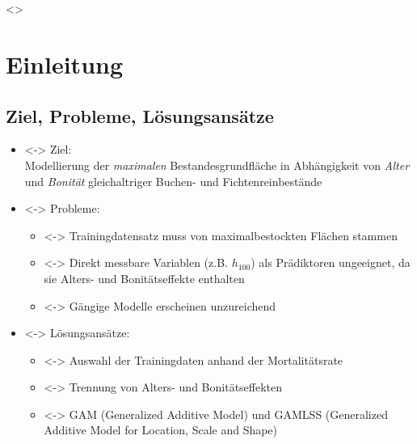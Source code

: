 
\section*{}
\begin{frame}[c]
  \only<\theFirstElement>{}
\end{frame}

\section{Einleitung}
\subsection{Ziel, Probleme, Lösungsansätze}
\begin{frame}[c]
  \begin{itemize}
  \item<\theFirstElement-> Ziel: \\
    Modellierung der \emph{maximalen} Bestandesgrundfläche in Abhängigkeit von \emph{Alter} und \emph{Bonität} gleichaltriger Buchen- und Fichtenreinbestände
  \item<\theSecondElement-> Probleme:
    \begin{itemize}
    \item<\theSecondElement-> Trainingdatensatz muss von maximalbestockten Flächen stammen
    \item<\theSecondElement-> Direkt messbare Variablen (z.B. \(h_{100}\)) als Prädiktoren ungeeignet, da sie Alters- und Bonitätseffekte enthalten
    \item<\theSecondElement-> Gängige Modelle erscheinen unzureichend
    \end{itemize}
  \end{itemize}
  \begin{itemize}
  \item<\theThirdElement-> Lösungsansätze:
    \begin{itemize}
    \item<\theThirdElement-> Auswahl der Trainingdaten anhand der Mortalitätsrate
    \item<\theThirdElement-> Trennung von Alters- und Bonitätseffekten
    \item<\theThirdElement-> GAM (Generalized Additive Model) und GAMLSS (Generalized Additive Model for Location, Scale and Shape)
    \end{itemize}
  \end{itemize}
\end{frame}

